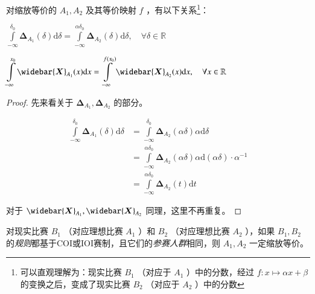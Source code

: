        \begin{proposition}[缩放等价的实际含义]
            对缩放等价的 $A_1,A_2$ 及其等价映射 $f$ ，有以下关系\footnote{可以直观理解为：现实比赛 $B_1$ （对应于 $A_1$ ）中的分数，经过 $f:x\mapsto\alpha x+\beta$ 的变换之后，变成了现实比赛 $B_2$ （对应于 $A_2$ ）中的分数}：
            \begin{asparaenum}
                \item $\displaystyle\int\limits_{-\infty}^{\delta_0} \bm{\Delta}_{A_1}(\delta)\mathrm{d}\delta=\displaystyle\int\limits_{-\infty}^{\alpha\delta_0} \bm{\Delta}_{A_2}(\delta)\mathrm{d}\delta,\quad\forall\delta\in\mathbb{R}$
                \item $\displaystyle\int\limits_{-\infty}^{x_0} \widebar{\bm{X}}_{A_1}(x)\mathrm{d}x=\displaystyle\int\limits_{-\infty}^{f(x_0)} \widebar{\bm{X}}_{A_2}(x)\mathrm{d}x,\quad\forall x\in\mathbb{R}$
            \end{asparaenum}

            \label{prop:equivalenceAfterScalingMeaning}
        \end{proposition}

        \begin{proof}
            先来看关于 $\bm{\Delta}_{A_1},\bm{\Delta}_{A_2}$ 的部分。

            \begin{align*}
                \int\limits_{-\infty}^{\delta_0} \bm{\Delta}_{A_1}(\delta)\mathrm{d}\delta 
                &=\int\limits_{-\infty}^{\delta_0} \bm{\Delta}_{A_2}(\alpha\delta)\alpha\mathrm{d}\delta \\
                &=\int\limits_{-\infty}^{\alpha\delta_0} \bm{\Delta}_{A_2}(\alpha\delta)\alpha \mathrm{d}(\alpha\delta)\cdot\alpha^{-1} \\
                &=\int\limits_{-\infty}^{\alpha\delta_0}\bm{\Delta}_{A_2}(t)\mathrm{d}t
            \end{align*}

            对于 $\widebar{\bm{X}}_{A_1},\widebar{\bm{X}}_{A_2}$ 同理，这里不再重复。

        \end{proof}

        \begin{assumption}
            对现实比赛 $B_1$ （对应理想比赛 $A_1$ ）和 $B_2$ （对应理想比赛 $A_2$ ），如果 $B_1,B_2$ 的\emph{规则}都基于COI或IOI赛制，且它们的\emph{参赛人群}相同，则 $A_1,A_2$ 一定缩放等价。
            \label{ass:equivalenceBetweenCodingContests}
        \end{assumption}

